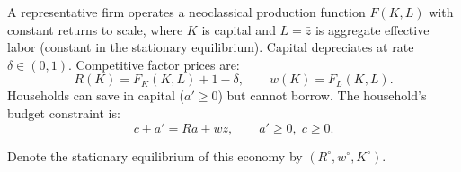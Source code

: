\documentclass[11pt,english]{article}
\begin{document}
A representative firm operates a neoclassical production function $F(K, L)$
with constant returns to scale, where $K$ is capital and $L = \bar{z}$ is
aggregate effective labor (constant in the stationary equilibrium). Capital
depreciates at rate $\delta \in (0,1)$. Competitive factor prices are:
\[
    R(K) = F_K(K, L) + 1 - \delta, \qquad w(K) = F_L(K, L).
\]
Households can save in capital ($a' \geq 0$) but cannot borrow. The
household's budget constraint is:
\[
    c + a' = Ra + wz, \qquad a' \geq 0,\; c \geq 0.
\]
 
 
Denote the stationary equilibrium of this economy by $(R^\circ, w^\circ,
K^\circ)$. 
 
\end{document}
